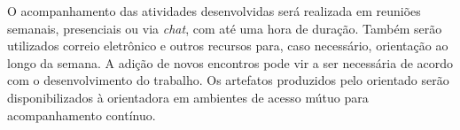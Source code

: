 O acompanhamento das atividades desenvolvidas será realizada em reuniões semanais, presenciais ou via \textit{chat}, com até uma hora de duração. Também serão utilizados correio eletrônico e outros recursos para, caso necessário, orientação ao longo da semana. A adição de novos encontros pode
vir a ser necessária de acordo com o desenvolvimento do trabalho. Os artefatos produzidos pelo orientado serão disponibilizados à orientadora em ambientes de acesso mútuo para acompanhamento contínuo.